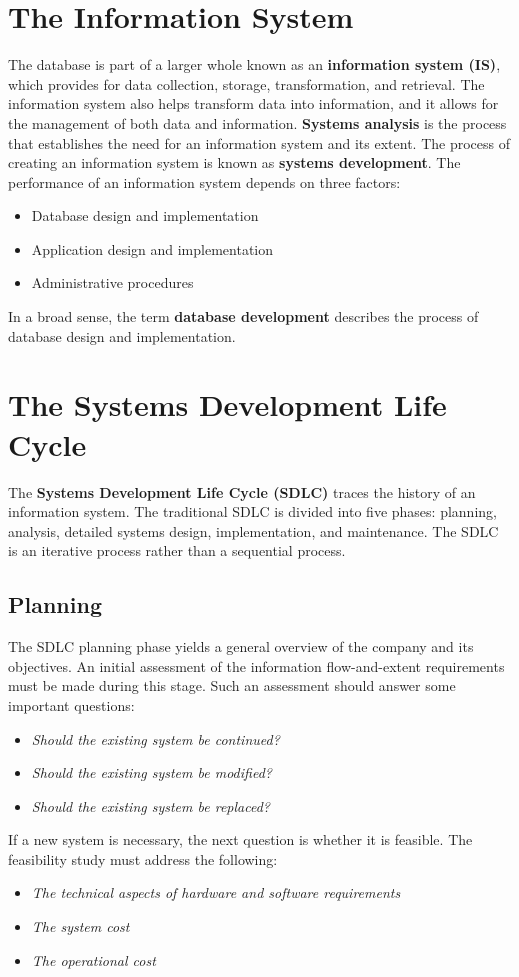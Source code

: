 \documentclass[a4paper, 12pt, titlepage]{report}
\begin{document}
\section{The Information System}
The database is part of a larger whole known as an \textbf{information system (IS)}, which provides for data collection, storage, transformation, and retrieval. The information system also helps transform data into information, and it allows for the management of both data and information. \textbf{Systems analysis} is the process that establishes the need for an information system and its extent. The process of creating an information system is known as \textbf{systems development}. The performance of an information system depends on three factors:
\begin{itemize}
\item Database design and implementation
\item Application design and implementation
\item Administrative procedures
\end{itemize}
In a broad sense, the term \textbf{database development} describes the process of database design and implementation.
\section{The Systems Development Life Cycle}
The \textbf{Systems Development Life Cycle (SDLC)} traces the history of an information system. The traditional SDLC is divided into five phases: planning, analysis, detailed systems design, implementation, and maintenance. The SDLC is an iterative process rather than a sequential process.
\subsection{Planning}
The SDLC planning phase yields a general overview of the company and its objectives. An initial assessment of the information flow-and-extent requirements must be made during this stage. Such an assessment should answer some important questions:
\begin{itemize}
\item \emph{Should the existing system be continued?}
\item \emph{Should the existing system be modified?}
\item \emph{Should the existing system be replaced?}
\end{itemize}
If a new system is necessary, the next question is whether it is feasible. The feasibility study must address the following:
\begin{itemize}
\item \emph{The technical aspects of hardware and software requirements}
\item \emph{The system cost}
\item \emph{The operational cost}
\end{itemize}
\end{document}
